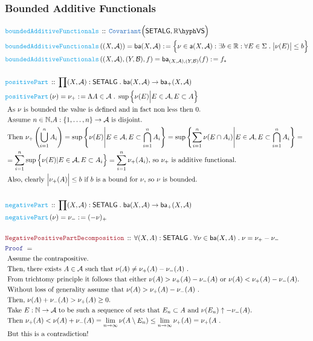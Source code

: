 \documentclass[12pt]{scrartcl}
\newcommand{\TYPE}[1]{\textcolor{NavyBlue}{\mathtt{#1}}}
\newcommand{\FUNC}[1]{\textcolor{Cerulean}{\mathtt{#1}}}
\newcommand{\LOGIC}[1]{\textcolor{Blue}{\mathtt{#1}}}
\newcommand{\THM}[1]{\textcolor{Maroon}{\mathtt{#1}}}
\renewcommand{\.}{\; . \;}
\newcommand{\de}{: \kern 0.1pc =}
\newcommand{\Act}[1]{\left( #1 \right)}
\newcommand{\Theorem}[2]{& \THM{#1} \, :: \, #2 \\ & \Proof = \\ }
\newcommand{\DeclareFunc}[2]{& \FUNC{#1} \, :: \, #2 \\}
\newcommand{\DefineNamedFunc}[4]{&  \FUNC{#1}\Act{#2} = #3 \de #4 \\}
\newcommand{\Page}[1]{ \begin{align*} #1 \end{align*}   }
\newcommand{\Reals}{\mathbb{R} }
\newcommand{\Nat}{\mathbb{N} }
\newcommand{\Proof}{\LOGIC{Proof} \; }
\newcommand{\Explain}[1]{& \text{#1.} \\}
\newcommand{\ExplainFurther}[1]{& \text{#1} \\}
\newcommand{\Exclaim}[1]{& \text{#1!} \\}
\newcommand{\Cov}{\TYPE{Covariant}}
\newcommand{\A}{\mathcal{A}}
\newcommand{\B}{\mathcal{B}}
\newcommand{\VS}[1]{#1\hyph\mathsf{VS}} %
\newcommand{\af}{\mathsf{a}}
\newcommand{\baf}{\mathsf{ba}}
\begin{document}
\subsubsection{Bounded Additive Functionals}
\Page{
	\DeclareFunc{boundedAdditiveFunctionals}{\Cov\Big(\mathsf{SETALG} , \VS{\Reals}\Big) }
	\DefineNamedFunc{boundedAdditiveFunctionals}{(X,\A)}{\baf(X,\A)}
	{
		\Big\{ \nu \in \af(X,\A) : \exists b \in \Reals : \forall E \in \Sigma \. \big|\nu(E)\big| \le b \Big\}	
	}
	\DefineNamedFunc{boundedAdditiveFunctionals}{(X,\A),(Y,\B),f}{\baf_{(X,\A),(Y,\B)}(f)}{f_*}
	\\
	\DeclareFunc{positivePart}{\prod (X,\A) : \mathsf{SETALG} \. \baf(X,\A) \to \baf_+(X,\A) }
	\DefineNamedFunc{positivePart}{\nu}{\nu_+}
	{\Lambda A \in \A \. \sup \Big\{ \nu(E) \Big| E \in \A, E \subset A  \Big\}}
	\Explain{ 
		As $\nu$ is bounded the value is defined and in fact non less then $0$}
	\Explain{
		Assume $n\in \Nat$,$A : \{1,\ldots,n\} \to \A$ is disjoint}
	\ExplainFurther{
		Then 
		$
			\nu_+\left( \bigcup^n_{i=1} A_i \right) =
			\sup \left\{ \nu(E) \Bigg| E \in \A, E \subset \bigcap^n_{i=1}A_i  \right\} =
			\sup \left\{ \sum^n_{i=1} \nu(E \cap A_i) \Bigg| E \in \A, E \subset \bigcap^n_{i=1}A_i  \right\}
			=$}
	\Explain{
		$
		=\sum^n_{i=1} \sup \Big\{ \nu(E) | E \in \A,E \subset A_i  \Big\} = \sum^n_{i=1} \nu_+(A_i)
		$, so $\nu_+$ is additive functional}
	\Explain{ 
		Also, clearly $\Big|\nu_+(A)\Big| \le b $ if $b$ is a bound for $\nu$,
		so $\nu$ is bounded}
	\\
	\DeclareFunc{negativePart}{\prod (X,\A) : \mathsf{SETALG} \. \baf(X,\A) \to \baf_+(X,\A) }
	\DefineNamedFunc{negativePart}{\nu}{\nu_-}
	{(-\nu)_+}
	\\
	\Theorem{
		NegativePositivePartDecomposition
	}	
	{
		\forall (X,A) : \mathsf{SETALG} \.
		\forall \nu \in \baf(X,A) \.
		\nu = \nu_+ - \nu_-
	}
	\Explain{
		Assume the contrapositive}
	\Explain{
		Then, there exists $A \in \A$ such that $\nu(A) \neq \nu_+(A) - \nu_-(A)$ }
	\Explain{
		From trichtomy principle it follows that either
		$\nu(A)> \nu_+(A) - \nu_-(A)$ or $\nu(A) <  \nu_+(A) - \nu_-(A)$}
	\Explain{
		Without loss of generality assume that $\nu(A)> \nu_+(A) - \nu_-(A)$ }
	\Explain{
		Then, $ \nu(A) + \nu_-(A) >  \nu_+(A) \ge 0 $}
	\Explain{
		Take $E : \Nat \to \A$ to be such a sequence of sets that 
		$E_n \subset A$ and $\nu(E_n) \uparrow -\nu_-(A)$}
	\Explain{
		Then $
			\nu_+(A) < \nu(A) + \nu_-(A) = 
			\lim_{n \to \infty} \nu(A \setminus E_n) \le 
			\lim_{n \to \infty} \nu_+(A) = \nu_+(A $
	}
	\Exclaim{
		But this is a contradiction}
}
\end{document}
